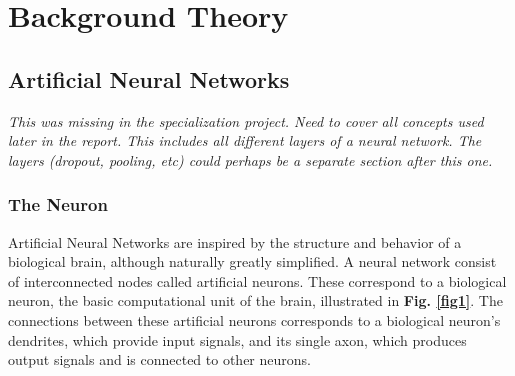 
\chapter{Background Theory}

\section{Artificial Neural Networks}

\textit{This was missing in the specialization project. Need to cover all concepts used later in the report. This includes all different layers of a neural network. The layers (dropout, pooling, etc) could perhaps be a separate section after this one.}

\subsection{The Neuron}

Artificial Neural Networks are inspired by the structure and behavior of a biological brain, although naturally greatly simplified. A neural network consist of interconnected nodes called artificial neurons. These correspond to a biological neuron, the basic computational unit of the brain, illustrated in \textbf{Fig. \ref{fig1}}. The connections between these artificial neurons corresponds to a biological neuron's dendrites, which provide input signals, and its single axon, which produces output signals and is connected to other neurons. \\

